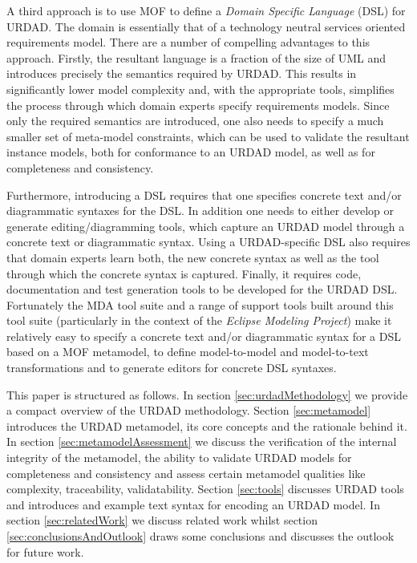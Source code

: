 A third approach is to use MOF to define a {\em Domain Specific Language} (DSL) for URDAD. The domain is essentially that of a technology neutral services oriented requirements model. There are a number of compelling advantages to this approach. Firstly, the resultant language is a fraction of the size of UML and introduces precisely the semantics required by URDAD. This results in significantly lower model complexity and, with the appropriate tools, simplifies the process through which domain experts specify requirements models. Since only the required semantics are introduced, one also needs to specify a much smaller set of meta-model constraints, which can be used to validate the resultant instance models, both for conformance to an URDAD model, as well as for completeness and consistency.

Furthermore, introducing a DSL requires that one specifies concrete text and/or diagrammatic syntaxes for the DSL. In addition one needs to either develop or generate editing/diagramming tools, which capture an URDAD model through a concrete text or diagrammatic syntax. Using a URDAD-specific DSL also requires that domain experts learn both, the new concrete syntax as well as the tool through which the concrete syntax is captured. Finally, it requires code, documentation and test generation tools to be developed for the URDAD DSL. Fortunately the MDA tool suite and a range of support tools built around this tool suite (particularly in the context of the {\em Eclipse Modeling Project}) make it relatively easy to specify a concrete text and/or diagrammatic syntax for a DSL based on a MOF metamodel, to define model-to-model and model-to-text transformations and to generate editors for concrete DSL syntaxes.

This paper is structured as follows. In section \ref{sec:urdadMethodology} we provide a compact overview of the URDAD methodology. Section \ref{sec:metamodel} introduces the URDAD metamodel, its core concepts and the rationale behind it. In section \ref{sec:metamodelAssessment} we discuss the verification of the internal integrity of the metamodel, the ability to validate URDAD models for completeness and consistency and assess certain metamodel qualities like complexity, traceability, validatability. Section \ref{sec:tools} discusses URDAD tools and introduces and example text syntax for encoding an URDAD model. In section \ref{sec:relatedWork} we discuss related work whilst section \ref{sec:conclusionsAndOutlook} draws some conclusions and discusses the outlook for future work.

